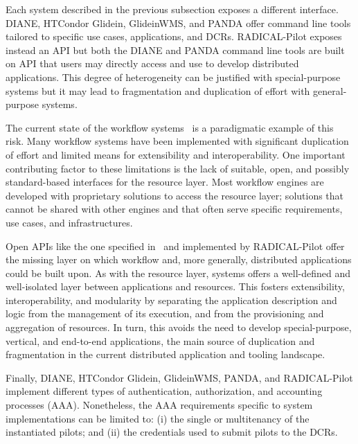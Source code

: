 \documentclass{sig-alternate}
\begin{document}

Each \pilot system described in the previous subsection exposes a different
interface.  DIANE, HTCondor Glidein, GlideinWMS, and
PANDA offer command line tools tailored to specific use cases, applications, and
DCRs. RADICAL-Pilot exposes instead an API but both the DIANE and PANDA command
line tools are built on API that users may directly access and use to develop
distributed applications. This degree of heterogeneity can be justified with
special-purpose \pilot systems but it may lead to fragmentation and duplication
of effort with general-purpose systems.

The current state of the workflow systems~\cite{taylor2014} is a paradigmatic
example of this risk. Many workflow systems have been implemented with
significant duplication of effort and limited means for extensibility and
interoperability. One important contributing factor to these limitations is the
lack of suitable, open, and possibly standard-based interfaces for the resource
layer. Most workflow engines are developed with proprietary solutions to access
the resource layer; solutions that cannot be shared with other engines and that
often serve specific requirements, use cases, and infrastructures. 


Open APIs like the one specified in~\cite{luckow2012b} and implemented by
RADICAL-Pilot offer the missing layer on which workflow and, more generally,
distributed applications could be built upon. As with the resource layer, \pilot
systems offers a well-defined and well-isolated layer between applications and
resources. This fosters extensibility, interoperability, and modularity by
separating the application description and logic from the management of its
execution, and from the provisioning and aggregation of resources. In turn, this
avoids the need to develop special-purpose, vertical, and end-to-end
applications, the main source of duplication and fragmentation in the current
distributed application and tooling landscape.


Finally, DIANE, HTCondor Glidein, GlideinWMS, PANDA, and RADICAL-Pilot implement
different types of authentication, authorization, and accounting processes
(AAA). Nonetheless, the AAA requirements specific to \pilot system
implementations can be limited to: (i) the single or multitenancy of the
instantiated pilots; and (ii) the credentials used to submit pilots to the DCRs.
\end{document}

